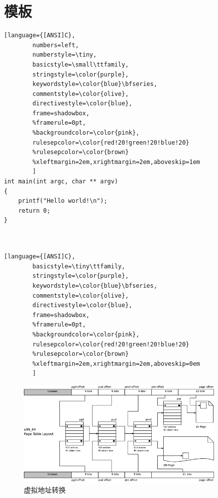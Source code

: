 \chapter{模板}

\begin{lstlisting}[language={[ANSI]C},
        numbers=left,
        numberstyle=\tiny,
        basicstyle=\small\ttfamily,
        stringstyle=\color{purple},
        keywordstyle=\color{blue}\bfseries,
        commentstyle=\color{olive},
        directivestyle=\color{blue},
        frame=shadowbox,
        %framerule=0pt,
        %backgroundcolor=\color{pink},
        rulesepcolor=\color{red!20!green!20!blue!20}
        %rulesepcolor=\color{brown}
        %xleftmargin=2em,xrightmargin=2em,aboveskip=1em
        ]
int main(int argc, char ** argv)
{
	printf("Hello world!\n");
	return 0;
}



\end{lstlisting}


\begin{lstlisting}[language={[ANSI]C},
        basicstyle=\tiny\ttfamily,
        stringstyle=\color{purple},
        keywordstyle=\color{blue}\bfseries,
        commentstyle=\color{olive},
        directivestyle=\color{blue},
        frame=shadowbox,
        %framerule=0pt,
        %backgroundcolor=\color{pink},
        rulesepcolor=\color{red!20!green!20!blue!20}
        %rulesepcolor=\color{brown}
        %xleftmargin=2em,xrightmargin=2em,aboveskip=0em
        ]
\end{lstlisting}




\begin{figure}[htbp]
\centering\includegraphics[width=0.9\textwidth]{va-to-pa.png}
\caption{虚拟地址转换}\label{fig:1}
\end{figure}